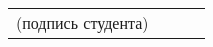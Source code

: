 \documentclass[12pt, А4, twoside]{article} %
\begin{document}
\begin{FlushLeft}
    \begin{tabular}{p{4.0cm} p{0.2cm} p{9.8cm} p{2.0cm}} %
        \textsf{(подпись студента)} & &
        \vspace{1pt} \hline & 
        \\ %
    \end{tabular} %

\end{FlushLeft} %
\end{document}
